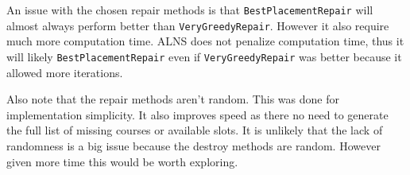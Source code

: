 An issue with the chosen repair methods is that \texttt{BestPlacementRepair} will almost always perform better than \texttt{VeryGreedyRepair}. However it also require much more computation time. ALNS does not penalize computation time, thus it will likely  \texttt{BestPlacementRepair} even if \texttt{VeryGreedyRepair} was better because it allowed more iterations.

Also note that the repair methods aren't random. This was done for implementation simplicity. It also improves speed as there no need to generate the full list of missing courses or available slots. It is unlikely that the lack of randomness is a big issue because the destroy methods are random. However given more time this would be worth exploring.

